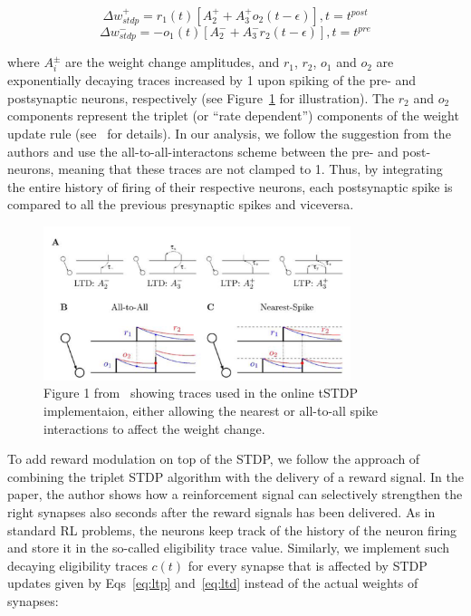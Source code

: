 \begin{equation}
\Delta w^{+}_{stdp} = r_{1}(t)[A^{+}_{2}+A^{+}_{3}o_{2}(t-\epsilon)],  t=t^{post}
\label{eq:ltp}
\end{equation}
\begin{equation}
\Delta w^{-}_{stdp} = -o_{1}(t)[A^{-}_{2}+A^{-}_{3}r_{2}(t-\epsilon)],  t=t^{pre}
\label{eq:ltd}
\end{equation}

where $A_{i}^{\pm}$ are the weight change amplitudes, and $r_1$, $r_2$, $o_1$ and $o_2$ are exponentially decaying traces increased by 1 upon spiking of the pre- and postsynaptic neurons, respectively (see Figure~\ref{fig:triplet_stdp} for illustration). The $r_2$ and $o_2$ components represent the triplet (or ``rate dependent'') components of the weight update rule (see~\cite{Pfister_Gerstner06} for details).
In our analysis, we follow the suggestion from the authors and use the all-to-all-interactons scheme between the pre- and post-neurons,
meaning that these traces are not clamped to 1. Thus, by integrating the entire history of firing of their respective neurons, each postsynaptic spike is compared to all the previous presynaptic spikes and viceversa.

\begin{figure}[h]
    \centering
    \includegraphics[width=0.8\textwidth]{img/chapter4/pfister2006.png}
    \caption[STDP rule illustration]{Figure 1 from~\cite{Pfister_Gerstner06} showing traces used in the online \ac{tSTDP} implementaion, either allowing the nearest or all-to-all spike interactions to affect the weight change.}
    \label{fig:triplet_stdp}
\end{figure}

To add reward modulation on top of the STDP, we follow the approach of~\cite{Izhikevich07, Gerstner_etal18} combining the triplet STDP algorithm with the delivery of a reward signal. In the paper, the author shows how a reinforcement signal can selectively strengthen the right synapses also seconds after the reward signals has been delivered.
As in standard RL problems, the neurons keep track of the history of the neuron firing and store it in the so-called eligibility trace value. Similarly, we implement such decaying eligibility traces $c(t)$ for every synapse that is affected by STDP updates given by Eqs~\ref{eq:ltp} and~\ref{eq:ltd} instead of the actual weights of synapses:


